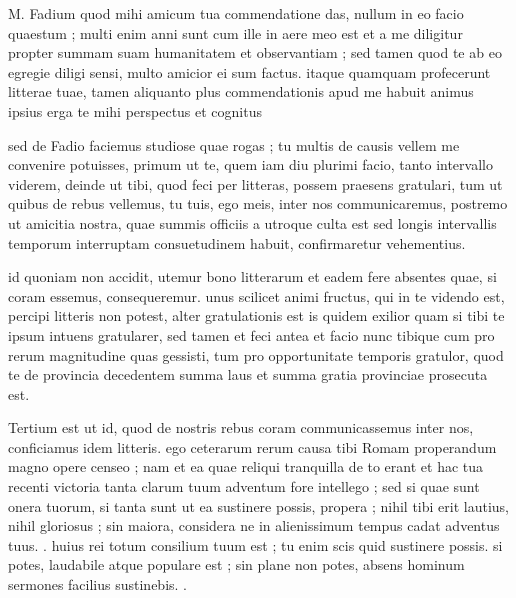


 M. Fadium quod mihi amicum tua commendatione das, nullum in eo facio quaestum ; multi enim anni sunt cum ille in aere meo est et a me diligitur propter summam suam humanitatem et observantiam ; sed tamen quod te ab eo egregie diligi sensi, multo amicior ei sum factus. itaque quamquam profecerunt litterae tuae, tamen aliquanto plus commendationis apud me habuit animus ipsius erga te mihi perspectus et cognitus

 sed de Fadio faciemus studiose quae rogas ; tu multis de causis vellem me convenire potuisses, primum ut te, quem iam diu plurimi facio, tanto intervallo viderem, deinde ut tibi, quod feci per litteras, possem praesens gratulari, tum ut quibus de rebus vellemus, tu tuis, ego meis, inter nos communicaremus, postremo ut amicitia nostra, quae summis officiis a utroque culta est sed longis intervallis temporum interruptam consuetudinem habuit, confirmaretur vehementius.

 id quoniam non accidit, utemur bono litterarum et eadem fere absentes quae, si coram essemus, consequeremur. unus scilicet animi fructus, qui in te videndo est, percipi litteris non potest, alter gratulationis est is quidem exilior quam si tibi te ipsum intuens gratularer, sed tamen et feci antea et facio nunc tibique cum pro rerum magnitudine quas gessisti, tum pro opportunitate temporis gratulor, quod te de provincia decedentem summa laus et summa gratia provinciae prosecuta est.

 Tertium est ut id, quod de nostris rebus coram communicassemus inter nos, conficiamus idem litteris. ego ceterarum rerum causa tibi Romam properandum magno opere censeo ; nam et ea quae reliqui tranquilla de to erant et hac tua recenti victoria tanta clarum tuum adventum fore intellego ; sed si quae sunt onera tuorum, si tanta sunt ut ea sustinere possis, propera ; nihil tibi erit lautius, nihil gloriosus ; sin maiora, considera ne in alienissimum tempus cadat adventus tuus. . huius rei totum consilium tuum est ; tu enim scis quid sustinere possis. si potes, laudabile atque populare est ; sin plane non potes, absens hominum sermones facilius sustinebis. .

